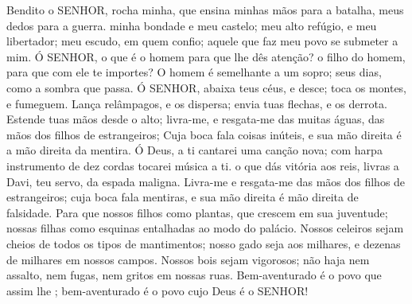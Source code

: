 
{\PP 
  Bendito
{} o SENHOR, rocha minha, que ensina minhas mãos para a batalha,
{} meus dedos para a guerra.
   minha bondade e meu castelo; meu alto refúgio, e meu libertador;
{} meu escudo, em quem confio;
{} aquele que faz meu povo se submeter a mim.
  Ó SENHOR, o que é o homem para que lhe dês atenção?
{} o filho do homem, para que com ele te importes?
  O homem é semelhante a um sopro; seus dias, como a sombra que passa.
  Ó SENHOR, abaixa teus céus, e desce; toca os montes, e fumeguem.
  Lança relâmpagos, e os dispersa; envia tuas flechas, e os derrota.
  Estende tuas mãos desde o alto; livra-me, e resgata-me das muitas águas, das mãos dos filhos de estrangeiros;
  Cuja boca fala coisas inúteis, e sua mão direita é a mão direita da mentira.
  Ó Deus, a ti cantarei uma canção nova; com harpa
{} instrumento de dez cordas tocarei música a ti.
   o que dás vitória aos reis,
{} livras a Davi, teu servo, da espada maligna.
  Livra-me e resgata-me das mãos dos filhos de estrangeiros; cuja boca fala mentiras, e sua mão direita é mão direita de falsidade.
  Para que nossos filhos
{} como plantas, que crescem em sua juventude;
{} nossas filhas
{} como esquinas entalhadas ao modo do palácio.
  Nossos celeiros sejam cheios de todos os tipos de mantimentos; nosso gado seja aos milhares, e dezenas de milhares em nossos campos.
  Nossos bois sejam vigorosos; não haja nem assalto, nem fugas, nem gritos em nossas ruas.
  Bem-aventurado é o povo que assim lhe
{} ; bem-aventurado é o povo cujo Deus é o SENHOR!
\par }


